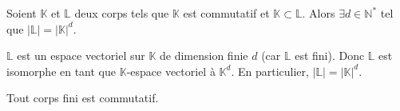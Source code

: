





	\begin{lemma}
		\label{theoreme-de-wedderburn-1}
		Soient $\mathbb{K}$ et $\mathbb{L}$ deux corps tels que $\mathbb{K}$ est commutatif et $\mathbb{K} \subset \mathbb{L}$. Alors $\exists d \in \mathbb{N}^*$ tel que $|\mathbb{L}| = |\mathbb{K}|^d$.
	\end{lemma}

	\begin{demonstration}
		$\mathbb{L}$ est un espace vectoriel sur $\mathbb{K}$ de dimension finie $d$ (car $\mathbb{L}$ est fini). Donc $\mathbb{L}$ est isomorphe en tant que $\mathbb{K}$-espace vectoriel à $\mathbb{K}^d$. En particulier, $|\mathbb{L}| = |\mathbb{K}|^d$.
	\end{demonstration}

	\begin{theorem}[Wedderburn]
		Tout corps fini est commutatif.
	\end{theorem}

